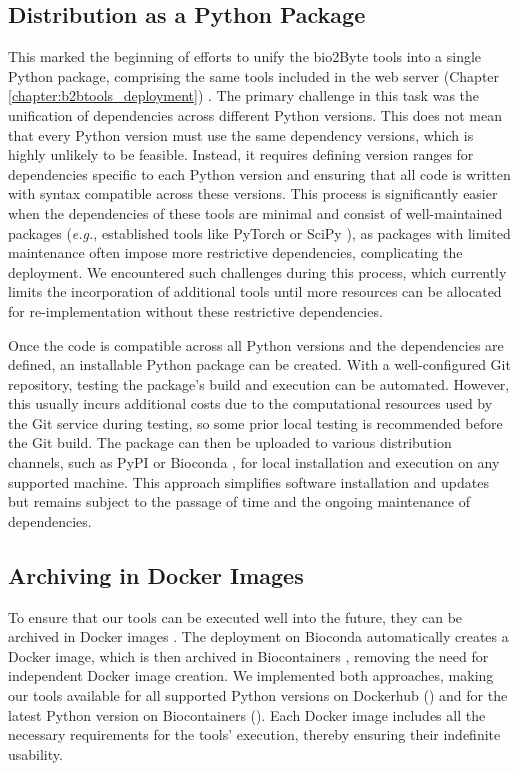 \subsection{Distribution as a Python Package}

This marked the beginning of efforts to unify the bio2Byte tools into a single Python package, comprising the same tools included in the web server (Chapter \ref{chapter:b2btools_deployment}) \cite{gavalda-garcia_bio2byte_2024}. The primary challenge in this task was the unification of dependencies across different Python versions. This does not mean that every Python version must use the same dependency versions, which is highly unlikely to be feasible. Instead, it requires defining version ranges for dependencies specific to each Python version and ensuring that all code is written with syntax compatible across these versions. This process is significantly easier when the dependencies of these tools are minimal and consist of well-maintained packages (\textit{e.g.}, established tools like PyTorch \cite{paszke_pytorch_2019} or SciPy \cite{mckinney-proc-scipy-2010}), as packages with limited maintenance often impose more restrictive dependencies, complicating the deployment. We encountered such challenges during this process, which currently limits the incorporation of additional tools until more resources can be allocated for re-implementation without these restrictive dependencies.

Once the code is compatible across all Python versions and the dependencies are defined, an installable Python package can be created. With a well-configured Git repository, testing the package's build and execution can be automated. However, this usually incurs additional costs due to the computational resources used by the Git service during testing, so some prior local testing is recommended before the Git build. The package can then be uploaded to various distribution channels, such as PyPI \cite{pypi} or Bioconda \cite{gruning_bioconda_2018}, for local installation and execution on any supported machine. This approach simplifies software installation and updates but remains subject to the passage of time and the ongoing maintenance of dependencies.


\subsection{Archiving in Docker Images}

To ensure that our tools can be executed well into the future, they can be archived in Docker images \cite{merkel2014docker}. The deployment on Bioconda automatically creates a Docker image, which is then archived in Biocontainers \cite{da_veiga_leprevost_biocontainers_2017}, removing the need for independent Docker image creation. We implemented both approaches, making our tools available for all supported Python versions on Dockerhub () and for the latest Python version on Biocontainers (). Each Docker image includes all the necessary requirements for the tools' execution, thereby ensuring their indefinite usability.


